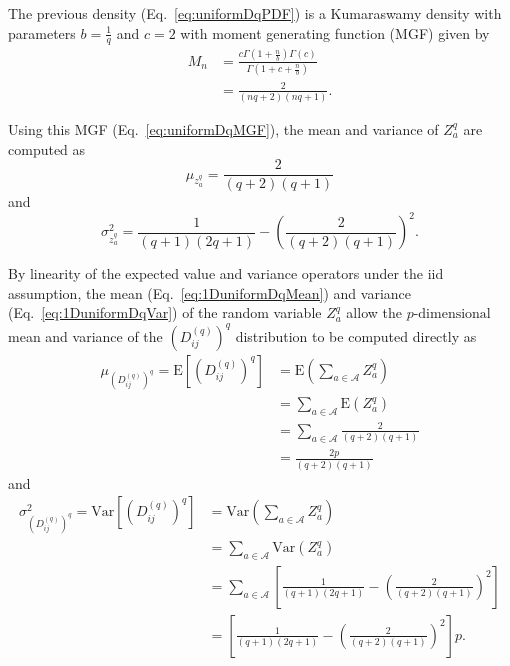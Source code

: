 \documentclass[aos]{imsart}
\begin{document}
The previous density (Eq.~\ref{eq:uniformDqPDF}) is a Kumaraswamy density with parameters $b = \frac{1}{q}$ and $c = 2$ with moment generating function (MGF) given by
%
\begin{equation}\label{eq:uniformDqMGF}
\begin{aligned}
M_n &=  \frac{c\Gamma\left(1 + \frac{n}{b}\right) \Gamma(c)}{\Gamma\left(1 + c + \frac{n}{b}\right)}\\
&= \frac{2}{(nq + 2)(nq + 1)}.
\end{aligned}
\end{equation}

Using this MGF (Eq.~\ref{eq:uniformDqMGF}), the mean and variance of $Z^q_a$ are computed as
%
\begin{equation}\label{eq:1DuniformDqMean}
\mu_{z^q_a} = \frac{2}{(q + 2)(q + 1)}
\end{equation}
%
and
%
\begin{equation}\label{eq:1DuniformDqVar}
\sigma^2_{z^q_a} = \frac{1}{(q + 1)(2q + 1)} - \left(\frac{2}{(q + 2)(q + 1)}\right)^2.
\end{equation}

By linearity of the expected value and variance operators under the iid assumption, the mean (Eq.~\ref{eq:1DuniformDqMean}) and variance (Eq.~\ref{eq:1DuniformDqVar}) of the random variable $Z^q_a$ allow the $p \text{-dimensional}$ mean and variance of the $\left(D^{(q)}_{ij}\right)^q$ distribution to be computed directly as
%
\begin{equation}\label{eq:uniformDqMean}
\begin{split}
\mu_{\left(D^{(q)}_{ij}\right)^q} = \text{E}\left[\left(D^{(q)}_{ij}\right)^q\right] &= \text{E}\left(\sum_{a \in \mathcal{A}}Z^q_a\right) \\
&= \sum_{a \in \mathcal{A}} \text{E}(Z^q_a) \\
&= \sum_{a \in \mathcal{A}} \frac{2}{(q + 2)(q + 1)} \\
&= \frac{2p}{(q + 2)(q + 1)}
\end{split}
\end{equation}
%
and
%
\begin{equation}\label{eq:uniformDqVar}
\begin{split}
\sigma^2_{\left(D^{(q)}_{ij}\right)^q} = \text{Var}\left[\left(D^{(q)}_{ij}\right)^q\right] &= \text{Var}\left(\sum_{a \in \mathcal{A}} Z^q_a\right) \\
&= \sum_{a \in \mathcal{A}} \text{Var}\left(Z^q_a\right) \\
&= \sum_{a \in \mathcal{A}} \left[\frac{1}{(q + 1)(2q + 1)} - \left(\frac{2}{(q + 2)(q + 1)}\right)^2\right] \\
&= \left[\frac{1}{(q + 1)(2q + 1)} - \left(\frac{2}{(q + 2)(q + 1)}\right)^2\right]p.
\end{split}
\end{equation}
\end{document}

